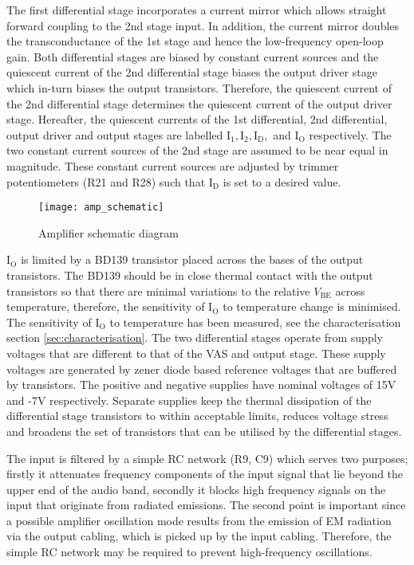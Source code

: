 \documentclass[a4paper,10pt, oneside]{article}
\begin{document}
The first differential stage incorporates a current mirror which allows straight forward coupling to the 2nd stage input. In addition, the current mirror doubles the transconductance of the 1st stage and hence the low-frequency open-loop gain. Both differential stages are biased by constant current sources and the quiescent current of the 2nd differential stage biases the output driver stage which in-turn biases the output transistors. Therefore, the quiescent current of the 2nd differential 
stage determines the quiescent current of the output driver stage. Hereafter, the quiescent currents of the 1st differential, 2nd differential, output driver and output stages are labelled $\textrm{I}_{1}, \textrm{I}_{2}, \textrm{I}_{\textrm{D}}, $ 
and $\textrm{I}_{\textrm{O}}$ respectively. The two constant current sources of the 2nd stage are assumed to be near equal in magnitude. These constant current sources are adjusted by trimmer potentiometers (R21 and R28) such that $\textrm{I}_{\textrm{D}}$ is set to a desired value. 
\begin{figure}[H]
\begin{centering}
\vspace{-2cm}
\hspace*{-1.3cm}
	\texttt{[image: amp\_schematic]}
	\caption{Amplifier schematic diagram}\label{sch}
\end{centering}
\end{figure}
$\textrm{I}_{\textrm{O}}$ is limited by a BD139 transistor placed across the bases of the output transistors. The BD139 should be in close thermal contact with the output transistors so that there are minimal variations to the relative $V_{\textrm{BE}}$ across temperature, 
therefore, the sensitivity of $\textrm{I}_{\textrm{O}}$ to temperature change is minimised. The sensitivity of $\textrm{I}_{\textrm{O}}$ to temperature has been measured, see the characterisation section \ref{sec:characterisation}.
The two differential stages operate from supply voltages that are different to that of the VAS and output stage. These supply voltages are generated by zener diode based reference voltages that are buffered by transistors. The positive and negative supplies have 
nominal voltages of 15V and -7V respectively. Separate supplies keep the thermal dissipation of the differential stage transistors to within acceptable limits, reduces voltage stress and broadens the set of transistors that can be utilised 
by the differential stages. 

The input is filtered by a simple RC network (R9, C9) which serves two purposes; firstly
it attenuates frequency components of the input signal that lie beyond the upper end of the audio band, secondly it blocks high frequency signals on the input that originate from radiated emissions. The second point is important since a possible amplifier oscillation mode results from the emission of EM radiation via the output cabling, which is picked up by the input cabling. Therefore, the simple RC network may be required to prevent high-frequency oscillations. 
\end{document}
